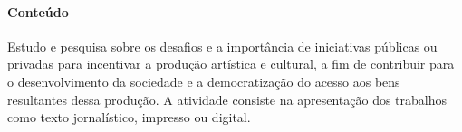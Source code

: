 \documentclass[12pt]{extarticle}
\begin{document}

\paragraph{Conteúdo} Estudo e pesquisa sobre os desafios e a importância
de iniciativas públicas ou privadas para incentivar a produção artística
e cultural, a fim de contribuir para o desenvolvimento da sociedade e a
democratização do acesso aos bens resultantes dessa produção. A
atividade consiste na apresentação dos trabalhos como texto
jornalístico, impresso ou digital.
\end{document}
